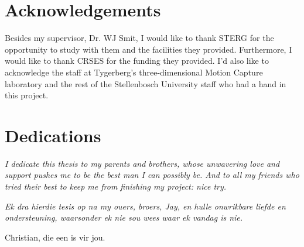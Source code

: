 \chapter{Acknowledgements}%

Besides my supervisor, Dr. WJ Smit, I would like to thank STERG for the opportunity to study with them and the facilities they provided. Furthermore, I would like to thank CRSES for the funding they provided. I'd also like to acknowledge the staff at Tygerberg's three-dimensional Motion Capture laboratory and the rest of the Stellenbosch University staff who had a hand in this project.

\chapter{Dedications}%

\vfill
\begin{center}\itshape%
  I dedicate this thesis to my parents and brothers, whose unwavering love and support pushes me to be the best man I can possibly be. And to all my friends who tried their best to keep me from finishing my project: nice try.
\end{center}
\vfill

\vfill
\begin{Afr}
  \begin{center}\itshape%
    Ek dra hierdie tesis op na my ouers, broers, Jay, en hulle onwrikbare liefde en ondersteuning, waarsonder ek nie sou wees waar ek vandag is nie. 

    Christian, die een is vir jou.
  \end{center}
\end{Afr}
\vfill
\clearpage
	   
\endinput
